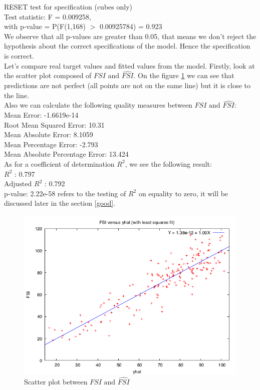 \documentclass{article}
\begin{document}
\noindent RESET test for specification (cubes only)\\
Test statistic: F = 0.009258,\\
with p-value = P(F(1,168) $>$ 0.00925784) = 0.923\\

We observe that all p-values are greater than 0.05, that means we don't reject the hypothesis about the correct specifications of the model. Hence the specification is correct.\\

Let's compare real target values and fitted values from the model. Firstly, look at the scatter plot composed of $FSI \text{ and } \widehat{FSI}$. On the figure \ref{fig:y_yhat} we can see that predictions are not perfect (all points are not on the same line) but it is close to the line. \\

Also we can calculate the following quality measures between $FSI \text{ and } \widehat{FSI}$:\\

\noindent Mean Error:                       -1.6619e-14 \\
Root Mean Squared Error:           10.31 \\
Mean Absolute Error:               8.1059\\
Mean Percentage Error:            -2.793\\
Mean Absolute Percentage Error:    13.424\\

As for a coefficient of determination $R^2$, we see the following result:\\

\noindent $R^2$ : 0.797 \\
$\text{Adjusted } R^2$ : 0.792 \\
p-value: 2.22e-58 refers to the testing of $R^2$ on equality to zero, it will be discussed later in the section \ref{good}.\\

\begin{figure}[h]
\begin{center}
\includegraphics[width=.8\textwidth]{y_yhat}
\caption{Scatter plot between $FSI \text{ and } \widehat{FSI}$}
\label{fig:y_yhat}
\end{center}
\end{figure}
\end{document}
